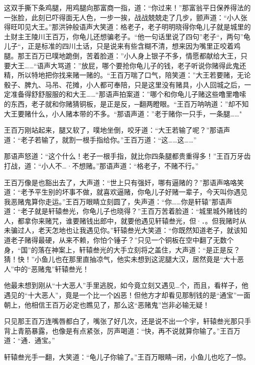 \documentclass[12pt,oneside]{book}
\begin{document}
这双手撕下条鸡腿，用鸡腿向那富商一指，道：``你过来！''那富翁平日保养得法的一张脸，此刻已吓得面无人色，一步一挨，战战兢兢走了几步，颤声道：``小人张得旺叩见大王。''那洪钟般语声大笑道：格老子，老子明明晓得你龟儿子就是城里的土财主王陵川王百万，你龟儿还想骗老子。``他一句话里说了四句''老子``，两句''龟儿子``，正是标准的四川土话，只是说来有些含糊不清，想来因为嘴里正咬着鸡腿。那王百万已噗地跪倒，苦着脸道：''小人身上银子不多，情愿都献给大王，只要大王\ldots\ldots{}``语声大骂道：''放屁，哪个要抢你龟儿子的钱，老子听说你赌得此鬼还精，所以特地把你找来赌一赌的。``王百万喘了口气，陪笑道：''大王若要赌，无论骰子、脾九、马吊、花摊，小人都可奉陪，只是这里没有赌具，小人回城之后，一定准备得舒舒服服的和大王\ldots\ldots{}``那语声拍案道：''哪个和你龟儿子赌这些噜里噜嗦的东西，老子就和你赌猜铜板，是正是反，─翻两瞪眼。``王百万呐呐道：''却不知大王要赌什么，小人赌本带的不多。``那语声道：''老于赌你一只手，一条腿\ldots\ldots"

王百万刚站起来，腿又软了，噗地坐倒，咬牙道：``大王若输了呢？''那语声道：``老子若输了，就割一根手指给你。''王百万道：``这\ldots\ldots 这\ldots\ldots{}''

那语声怒道：``这个什么！老子一根手指，就比你四条腿都贵重得多！''王百万牙齿打战，道：``小人不\ldots·不想赌。''那语声道：``格老子，不赌不行。''

王百万像是也豁出去了，大声道：``世上只有强奸，哪有逼赌的？''那语声咯咯笑道：``老予平生别的坏事不做，就喜欢逼赌，你龟儿子好赌一辈子，今天叫你遇见我恶赌鬼算你走运。''王百万眼睛立刻圆了，失声道：``你\ldots\ldots 你是轩辕''那语声道：``老子就是轩辕叁光，你龟儿子也晓得？''王百万苦着脸道：``城里城外赌钱的人，都拿你来赌咒，谁要赌钱出郎中，就要他遇见轩辕叁光，但·．。但我赌时从未骗过人，老天怎地也让我遇见你。''轩辕叁光大笑道：``你既然知道老子，就该知道老子赌得最硬，从来不赖，你怕个锤子？''只见一个铜板在空中翻了无数个身，``国''的落在神案上，轩辕叁光的大手立刻将之盖住，大声道：``是正是反？猜！快！''小鱼儿也在那里直抽凉气，他实未想到这泥腿大汉，居然竟是``大十恶人''中的``恶赌鬼''轩辕叁光！

他最未想到刚从``十大恶人''手里逃脱，如今竟立刻又遇见\ldots 个，而且，看样子，他遇见的``十大恶人''，竟是一个比一个凶恶！但他方才却看见那制钱的是``通宝''一面朝上，他相信王百万必定也瞧见了，那么这``恶赌鬼''岂非必输无疑！

只见那王百万连嘴唇都白了，嘴张了好几次，还是说不出一个宇，轩辕叁光那只手背上青筋暴露，也像是有点紧张，厉声喝道：``快，再不说就算你输了。''王百万道：``通．通宝。''

轩辕叁光手一翻，大笑道：``龟儿子你输了。''王百万眼睛─闭，小鱼儿也吃了─惊。
\end{document}
